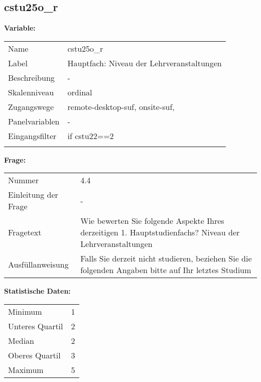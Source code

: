 	
	
	\subsection{cstu25o\_r}
	\label{subSection:cstu25o_r}

	\noindent\textbf{Variable:}\\
		\begin{tabular}{lL{11.3cm}}
			\label{tableVariable:cstu25o_r}
			Name & cstu25o\_r \\
			Label & Hauptfach: Niveau der Lehrveranstaltungen \\
			Beschreibung & - \\
			Skalenniveau & ordinal \\
			Zugangswege &
				remote-desktop-suf,
				onsite-suf,
 \\
			Panelvariablen & -
			 \\
			Eingangsfilter & if cstu22==2 \\
 \\
		\end{tabular}

		\vspace*{1 cm}
		\noindent\textbf{Frage:}\\
		\begin{tabular}{lL{11.3cm}}
			\label{tableQuestion:cstu25o_r}
			Nummer & 4.4 \\
			Einleitung der Frage & - \\
			Fragetext & Wie bewerten Sie folgende Aspekte Ihres derzeitigen 1. Hauptstudienfachs?
Niveau der Lehrveranstaltungen \\
			Ausfüllanweisung & Falls Sie derzeit nicht studieren, beziehen Sie die folgenden Angaben bitte auf Ihr letztes Studium \\
		\end{tabular}


		\vspace*{1 cm}
		\noindent\textbf{Statistische Daten:}\\
			\begin{tabular}{ll}
				\label{tableStatistics:cstu25o_r}
					Minimum & 1 \\
					Unteres Quartil & 2 \\
					Median & 2 \\
					Oberes Quartil & 3 \\
					Maximum & 5 \\
			\end{tabular}



